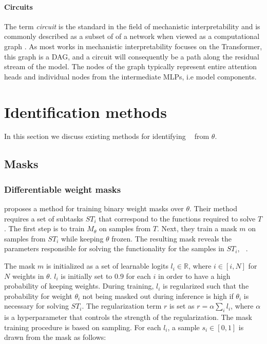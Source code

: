 \documentclass[11pt]{article}
\DeclareMathOperator*{\subnetwork}{\hat{\theta_i}}
\begin{document}
\paragraph{Circuits}
The term \textit{circuit} is the standard in the field of mechanistic interpretability and is commonly described as a subset of of a network when viewed as a computational graph \citep{conmy2023towards, nanda2023progress, wang2023interpretability}. As most works in mechanistic interpretability focuses on the Transformer, this graph is a DAG, and a circuit will consequently be a path along the residual stream of the model. The nodes of the graph typically represent entire attention heads and individual nodes from the intermediate MLPs, i.e model components.

\section{Identification methods}
In this section we discuss existing methods for identifying $\subnetwork$ from $\theta$.
\subsection{Masks}
\subsubsection{Differentiable weight masks}
\citet{csordas2020neural} proposes a method for training binary weight masks over $\theta$. Their method requires a set of subtasks $ST_i$ that correspond to the functions required to solve $T$. The first step is to train $M_\theta$ on samples from $T$.  Next, they train a mask $m$ on samples from $ST_i$ while keeping $\theta$ frozen. The resulting mask reveals the parameters responsible for solving the functionality for the samples in $ST_i$, $\subnetwork$.

The mask $m$ is initialized as a set of learnable logits $l_i \in \mathbb{R}$, where $i \in [i, N]$ for $N$ weights in $\theta$. $l_i$ is initially set to $0.9$ for each $i$ in order to have a high probability of keeping weights. During training, $l_i$ is regularized such that the probability for weight $\theta_i$ not being masked out during inference is high if $\theta_i$ is necessary for solving $ST_i$. The regularization term $r$ is set as $r = \alpha \sum_i l_i$, where $\alpha$ is a hyperparameter that controls the strength of the regularization. The mask training procedure is based on sampling. For each $l_i$, a sample $s_i \in [0, 1]$ is drawn from the mask as follows:
\end{document}
